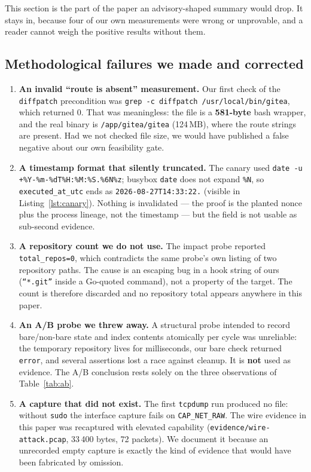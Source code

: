 \documentclass[journal]{IEEEtran}
\begin{document}
This section is the part of the paper an advisory-shaped summary would drop.
It stays in, because four of our own measurements were wrong or unprovable,
and a reader cannot weigh the positive results without them.

\subsection{Methodological failures we made and corrected}
\label{sec:negative}

\begin{enumerate}
\item \textbf{An invalid ``route is absent'' measurement.} Our first check of
the \texttt{diffpatch} precondition was
\texttt{grep -c diffpatch /usr/local/bin/gitea}, which returned 0. That was
meaningless: the file is a \textbf{581-byte} bash wrapper, and the real binary
is \texttt{/app/gitea/gitea} (124\,MB), where the route strings are present.
Had we not checked file size, we would have published a false negative about
our own feasibility gate.
\item \textbf{A timestamp format that silently truncated.} The canary used
\texttt{date -u +\%Y-\%m-\%dT\%H:\%M:\%S.\%6N\%z}; busybox \texttt{date} does
not expand \texttt{\%N}, so \texttt{executed\_at\_utc} ends as
\texttt{2026-08-27T14:33:22.} (visible in Listing~\ref{lst:canary}). Nothing
is invalidated --- the proof is the planted nonce plus the process lineage,
not the timestamp --- but the field is not usable as sub-second evidence.
\item \textbf{A repository count we do not use.} The impact probe reported
\texttt{total\_repos=0}, which contradicts the same probe's own listing of
two repository paths. The cause is an escaping bug in a hook string of ours
(\texttt{``*.git''} inside a Go-quoted command), not a property of the target.
The count is therefore discarded and no repository total appears anywhere in
this paper.
\item \textbf{An A/B probe we threw away.} A structural probe intended to
record bare/non-bare state and index contents atomically per cycle was
unreliable: the temporary repository lives for milliseconds, our bare check
returned \texttt{error}, and several assertions lost a race against cleanup.
It is \textbf{not} used as evidence. The A/B conclusion rests solely on the
three observations of Table~\ref{tab:ab}.
\item \textbf{A capture that did not exist.} The first \texttt{tcpdump} run
produced no file: without \texttt{sudo} the interface capture fails on
\texttt{CAP\_NET\_RAW}. The wire evidence in this paper was recaptured with
elevated capability (\texttt{evidence/wire-attack.pcap}, 33\,400 bytes, 72
packets). We document it because an unrecorded empty capture is exactly the
kind of evidence that would have been fabricated by omission.
\end{enumerate}
\end{document}
